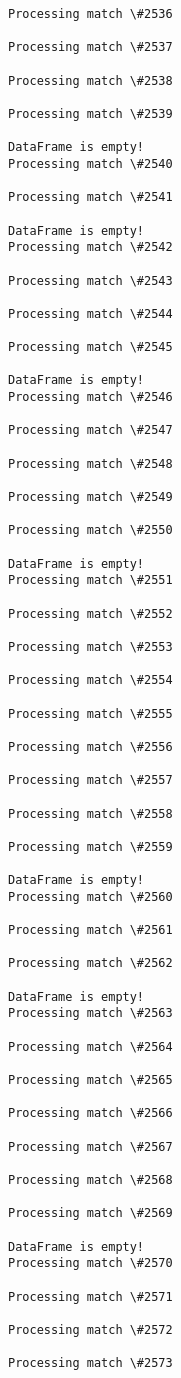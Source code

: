 \documentclass[11pt]{article}
\begin{document}
\begin{Verbatim}[commandchars=\\\{\}]
Processing match \#2536

Processing match \#2537

Processing match \#2538

Processing match \#2539

DataFrame is empty!
Processing match \#2540

Processing match \#2541

DataFrame is empty!
Processing match \#2542

Processing match \#2543

Processing match \#2544

Processing match \#2545

DataFrame is empty!
Processing match \#2546

Processing match \#2547

Processing match \#2548

Processing match \#2549

Processing match \#2550

DataFrame is empty!
Processing match \#2551

Processing match \#2552

Processing match \#2553

Processing match \#2554

Processing match \#2555

Processing match \#2556

Processing match \#2557

Processing match \#2558

Processing match \#2559

DataFrame is empty!
Processing match \#2560

Processing match \#2561

Processing match \#2562

DataFrame is empty!
Processing match \#2563

Processing match \#2564

Processing match \#2565

Processing match \#2566

Processing match \#2567

Processing match \#2568

Processing match \#2569

DataFrame is empty!
Processing match \#2570

Processing match \#2571

Processing match \#2572

Processing match \#2573


\end{Verbatim}
\end{document}
